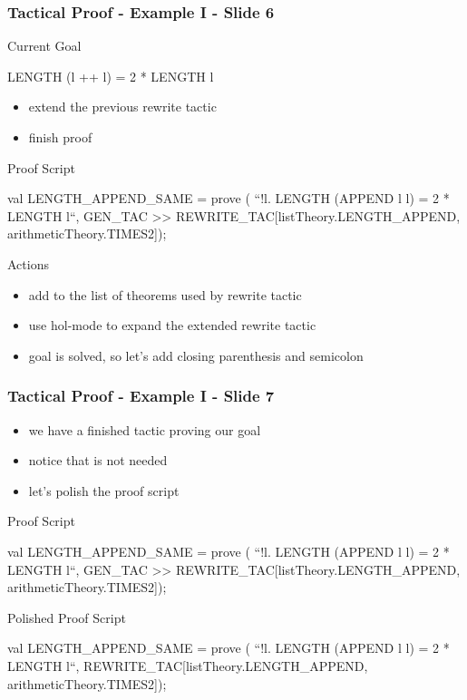 \begin{frame}[fragile]
\frametitle{Tactical Proof - Example I - Slide 6}

\begin{block}{Current Goal}
\begin{semiverbatim}\small
LENGTH (l ++ l) = 2 * LENGTH l
\end{semiverbatim}
\end{block}

\begin{itemize}
\item extend the previous rewrite tactic 
\item finish proof
\end{itemize}

\begin{block}{Proof Script}
\begin{semiverbatim}\small
val LENGTH_APPEND_SAME = prove (
  ``!l. LENGTH (APPEND l l) = 2 * LENGTH l``,
GEN_TAC >>
REWRITE_TAC[listTheory.LENGTH\_APPEND, arithmeticTheory.TIMES2]);
\end{semiverbatim}
\end{block}

\begin{block}{Actions}
\begin{itemize}
\item add  to the list of theorems used by rewrite tactic
\item use hol-mode to expand the extended rewrite tactic
\item goal is solved, so let's add closing parenthesis and semicolon
\end{itemize}
\end{block}
\end{frame}


\begin{frame}[fragile]
\frametitle{Tactical Proof - Example I - Slide 7}

\begin{itemize}
\item we have a finished tactic proving our goal
\item notice that  is not needed
\item let's polish the proof script
\end{itemize}

\begin{block}{Proof Script}
\begin{semiverbatim}\small
val LENGTH_APPEND_SAME = prove (
  ``!l. LENGTH (APPEND l l) = 2 * LENGTH l``,
GEN_TAC >>
REWRITE_TAC[listTheory.LENGTH\_APPEND, arithmeticTheory.TIMES2]);
\end{semiverbatim}
\end{block}

\begin{block}{Polished Proof Script}
\begin{semiverbatim}\small
val LENGTH_APPEND_SAME = prove (
  ``!l. LENGTH (APPEND l l) = 2 * LENGTH l``,
REWRITE_TAC[listTheory.LENGTH\_APPEND, arithmeticTheory.TIMES2]);
\end{semiverbatim}
\end{block}
\end{frame}



